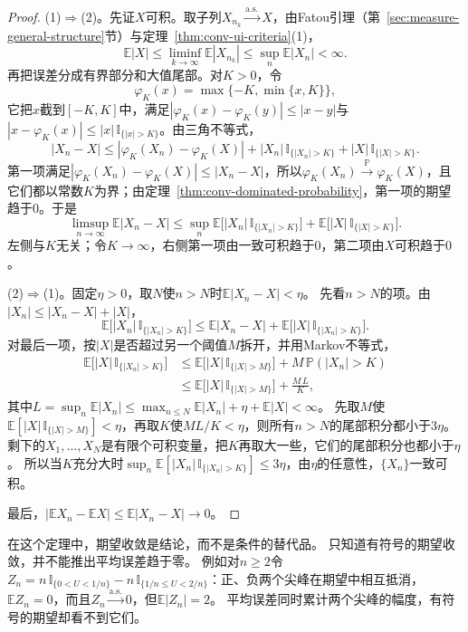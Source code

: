 \begin{proof}
(1)$\Rightarrow$(2)。先证$X$可积。取子列$X_{n_k}\xrightarrow{\mathrm{a.s.}}X$，由Fatou引理（第~\ref{sec:measure-general-structure}节）与定理~\ref{thm:conv-ui-criteria}(1)，
\[
  \mathbb E|X|\leq\liminf_{k\to\infty}\mathbb E|X_{n_{k}}|\leq\sup_n\mathbb E|X_n|<\infty.
\]
再把误差分成有界部分和大值尾部。对$K>0$，令
\[
  \varphi_K(x)=\max\{-K,\min\{x,K\}\},
\]
它把$x$截到$[-K,K]$中，满足$|\varphi_K(x)-\varphi_K(y)|\leq|x-y|$与$|x-\varphi_K(x)|\leq|x|\,\mathbb I_{\{|x|>K\}}$。由三角不等式，
\[
  |X_n-X|\leq|\varphi_K(X_n)-\varphi_K(X)|+|X_n|\,\mathbb I_{\{|X_n|>K\}}+|X|\,\mathbb I_{\{|X|>K\}}.
\]
第一项满足$|\varphi_K(X_n)-\varphi_K(X)|\leq|X_n-X|$，所以$\varphi_K(X_n)\xrightarrow{\mathbb P}\varphi_K(X)$，且它们都以常数$K$为界；由定理~\ref{thm:conv-dominated-probability}，第一项的期望趋于$0$。于是
\[
  \limsup_{n\to\infty}\mathbb E|X_n-X|\leq\sup_n\mathbb E\bigl[|X_n|\,\mathbb I_{\{|X_n|>K\}}\bigr]+\mathbb E\bigl[|X|\,\mathbb I_{\{|X|>K\}}\bigr].
\]
左侧与$K$无关；令$K\to\infty$，右侧第一项由一致可积趋于$0$，第二项由$X$可积趋于$0$。

(2)$\Rightarrow$(1)。固定$\eta>0$，取$N$使$n>N$时$\mathbb E|X_n-X|<\eta$。
先看$n>N$的项。由$|X_n|\leq|X_n-X|+|X|$，
\[
  \mathbb E\bigl[|X_n|\,\mathbb I_{\{|X_n|>K\}}\bigr]\leq\mathbb E|X_n-X|+\mathbb E\bigl[|X|\,\mathbb I_{\{|X_n|>K\}}\bigr].
\]
对最后一项，按$|X|$是否超过另一个阈值$M$拆开，并用Markov不等式，
\[
  \begin{aligned}
  \mathbb E\bigl[|X|\,\mathbb I_{\{|X_n|>K\}}\bigr]
  &\leq\mathbb E\bigl[|X|\,\mathbb I_{\{|X|>M\}}\bigr]+M\,\mathbb P(|X_n|>K)\\
  &\leq\mathbb E\bigl[|X|\,\mathbb I_{\{|X|>M\}}\bigr]+\frac{M\,L}{K},
  \end{aligned}
\]
其中$L=\sup_n\mathbb E|X_n|\leq\max_{n\leq N}\mathbb E|X_n|+\eta+\mathbb E|X|<\infty$。
先取$M$使$\mathbb E[|X|\,\mathbb I_{\{|X|>M\}}]<\eta$，再取$K$使$ML/K<\eta$，则所有$n>N$的尾部积分都小于$3\eta$。
剩下的$X_1,\ldots,X_N$是有限个可积变量，把$K$再取大一些，它们的尾部积分也都小于$\eta$。
所以当$K$充分大时$\sup_n\mathbb E[|X_n|\,\mathbb I_{\{|X_n|>K\}}]\leq3\eta$，由$\eta$的任意性，$\{X_n\}$一致可积。

最后，$|\mathbb EX_n-\mathbb EX|\leq\mathbb E|X_n-X|\to0$。
\end{proof}

在这个定理中，期望收敛是结论，而不是条件的替代品。
只知道有符号的期望收敛，并不能推出平均误差趋于零。
例如对$n\geq2$令$Z_n=n\,\mathbb I_{\{0<U<1/n\}}-n\,\mathbb I_{\{1/n\leq U<2/n\}}$：正、负两个尖峰在期望中相互抵消，$\mathbb EZ_n=0$，而且$Z_n\xrightarrow{\mathrm{a.s.}}0$，但$\mathbb E|Z_n|=2$。
平均误差同时累计两个尖峰的幅度，有符号的期望却看不到它们。

